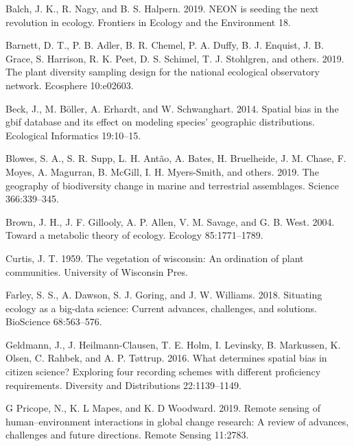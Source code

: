 \documentclass[
  12pt,
]{article}
\newlength{\cslhangindent}
\newenvironment{cslreferences}%
  {\setlength{\parindent}{0pt}%
  \everypar{\setlength{\hangindent}{\cslhangindent}}\ignorespaces}%
  {\par}
\begin{document}
\hypertarget{refs}{}
\begin{cslreferences}
\leavevmode\hypertarget{ref-balch2019neon}{}%
Balch, J. K., R. Nagy, and B. S. Halpern. 2019. NEON is seeding the next revolution in ecology. Frontiers in Ecology and the Environment 18.

\leavevmode\hypertarget{ref-barnett2019plant}{}%
Barnett, D. T., P. B. Adler, B. R. Chemel, P. A. Duffy, B. J. Enquist, J. B. Grace, S. Harrison, R. K. Peet, D. S. Schimel, T. J. Stohlgren, and others. 2019. The plant diversity sampling design for the national ecological observatory network. Ecosphere 10:e02603.

\leavevmode\hypertarget{ref-beck2014spatial}{}%
Beck, J., M. Böller, A. Erhardt, and W. Schwanghart. 2014. Spatial bias in the gbif database and its effect on modeling species' geographic distributions. Ecological Informatics 19:10--15.

\leavevmode\hypertarget{ref-blowes2019geography}{}%
Blowes, S. A., S. R. Supp, L. H. Antão, A. Bates, H. Bruelheide, J. M. Chase, F. Moyes, A. Magurran, B. McGill, I. H. Myers-Smith, and others. 2019. The geography of biodiversity change in marine and terrestrial assemblages. Science 366:339--345.

\leavevmode\hypertarget{ref-brown2004toward}{}%
Brown, J. H., J. F. Gillooly, A. P. Allen, V. M. Savage, and G. B. West. 2004. Toward a metabolic theory of ecology. Ecology 85:1771--1789.

\leavevmode\hypertarget{ref-curtis1959vegetation}{}%
Curtis, J. T. 1959. The vegetation of wisconsin: An ordination of plant communities. University of Wisconsin Pres.

\leavevmode\hypertarget{ref-farley2018situating}{}%
Farley, S. S., A. Dawson, S. J. Goring, and J. W. Williams. 2018. Situating ecology as a big-data science: Current advances, challenges, and solutions. BioScience 68:563--576.

\leavevmode\hypertarget{ref-geldmann2016determines}{}%
Geldmann, J., J. Heilmann-Clausen, T. E. Holm, I. Levinsky, B. Markussen, K. Olsen, C. Rahbek, and A. P. Tøttrup. 2016. What determines spatial bias in citizen science? Exploring four recording schemes with different proficiency requirements. Diversity and Distributions 22:1139--1149.

\leavevmode\hypertarget{ref-g2019remote}{}%
G Pricope, N., K. L Mapes, and K. D Woodward. 2019. Remote sensing of human--environment interactions in global change research: A review of advances, challenges and future directions. Remote Sensing 11:2783.


\end{cslreferences}
\end{document}
